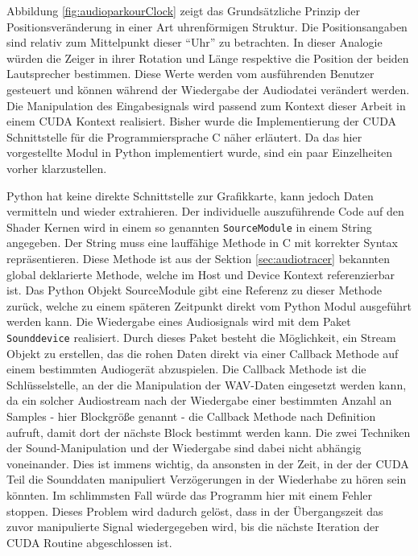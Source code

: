 Abbildung \ref{fig:audioparkourClock} zeigt das Grundsätzliche Prinzip der Positionsveränderung in einer Art uhrenförmigen Struktur. Die Positionsangaben sind relativ zum Mittelpunkt dieser \enquote{Uhr} zu betrachten. In dieser Analogie würden die Zeiger in ihrer Rotation und Länge respektive die Position der beiden Lautsprecher bestimmen. Diese Werte werden vom ausführenden Benutzer gesteuert und können während der Wiedergabe der Audiodatei verändert werden. Die Manipulation des Eingabesignals wird passend zum Kontext dieser Arbeit in einem CUDA Kontext realisiert. Bisher wurde die Implementierung der CUDA Schnittstelle für die Programmiersprache C näher erläutert. Da das hier vorgestellte Modul in Python implementiert wurde, sind ein paar Einzelheiten vorher klarzustellen. 

Python hat keine direkte Schnittstelle zur Grafikkarte, kann jedoch Daten vermitteln und wieder extrahieren. Der individuelle auszuführende Code auf den Shader Kernen wird in einem so genannten \texttt{SourceModule} in einem String angegeben. Der String muss eine lauffähige Methode in C mit korrekter Syntax repräsentieren. Diese Methode ist aus der Sektion \ref{sec:audiotracer} bekannten global deklarierte Methode, welche im Host und Device Kontext referenzierbar ist. Das Python Objekt SourceModule gibt eine Referenz zu dieser Methode zurück, welche zu einem späteren Zeitpunkt direkt vom Python Modul ausgeführt werden kann.
Die Wiedergabe eines Audiosignals wird mit dem Paket \texttt{Sounddevice} realisiert. Durch dieses Paket besteht die Möglichkeit, ein Stream Objekt zu erstellen, das die rohen Daten direkt via einer Callback Methode auf einem bestimmten Audiogerät abzuspielen. Die Callback Methode ist die Schlüsselstelle, an der die Manipulation der WAV-Daten eingesetzt werden kann, da ein solcher Audiostream nach der Wiedergabe einer bestimmten Anzahl an Samples - hier Blockgröße genannt - die Callback Methode nach Definition aufruft, damit dort der nächste Block bestimmt werden kann.
Die zwei Techniken der Sound-Manipulation und der Wiedergabe sind dabei nicht abhängig voneinander. Dies ist immens wichtig, da ansonsten in der Zeit, in der der CUDA Teil die Sounddaten manipuliert Verzögerungen in der Wiederhabe zu hören sein könnten. Im schlimmsten Fall würde das Programm hier mit einem Fehler stoppen. Dieses Problem wird dadurch gelöst, dass in der Übergangszeit das zuvor manipulierte Signal wiedergegeben wird, bis die nächste Iteration der CUDA Routine abgeschlossen ist. 

